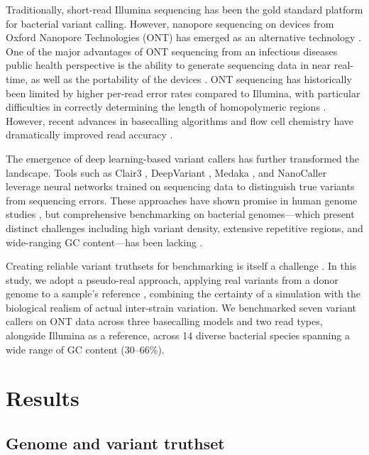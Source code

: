 \documentclass[11pt]{article}
\begin{document}
Traditionally, short-read Illumina sequencing has been the gold standard platform for bacterial variant calling. However, nanopore sequencing on devices from Oxford Nanopore Technologies (ONT) has emerged as an alternative technology \citep{jain2016}. One of the major advantages of ONT sequencing from an infectious diseases public health perspective is the ability to generate sequencing data in near real-time, as well as the portability of the devices \citep{quick2016, faria2016, loose2019}. ONT sequencing has historically been limited by higher per-read error rates compared to Illumina, with particular difficulties in correctly determining the length of homopolymeric regions \citep{delahaye2021, rang2018}. However, recent advances in basecalling algorithms and flow cell chemistry have dramatically improved read accuracy \citep{sanderson2023, chen2024, wick2022}.

The emergence of deep learning-based variant callers has further transformed the landscape. Tools such as Clair3 \citep{zheng2022}, DeepVariant \citep{poplin2018}, Medaka \citep{medaka2023}, and NanoCaller \citep{ahsan2021} leverage neural networks trained on sequencing data to distinguish true variants from sequencing errors. These approaches have shown promise in human genome studies \citep{wagner2022, olson2023}, but comprehensive benchmarking on bacterial genomes---which present distinct challenges including high variant density, extensive repetitive regions, and wide-ranging GC content---has been lacking \citep{barbitoff2021, bush2020, olm2020}.

Creating reliable variant truthsets for benchmarking is itself a challenge \citep{mao2023, li2014}. In this study, we adopt a pseudo-real approach, applying real variants from a donor genome to a sample's reference \citep{li2018synth}, combining the certainty of a simulation with the biological realism of actual inter-strain variation. We benchmarked seven variant callers on ONT data across three basecalling models and two read types, alongside Illumina as a reference, across 14 diverse bacterial species spanning a wide range of GC content (30--66\%).

\section{Results}

\subsection{Genome and variant truthset}
\end{document}
